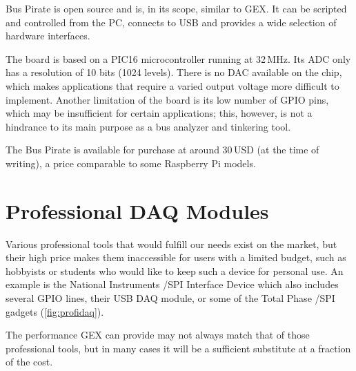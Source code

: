 Bus Pirate is open source and is, in its scope, similar to GEX. It can be scripted and controlled from the PC, connects to USB and provides a wide selection of hardware interfaces.

The board is based on a PIC16 microcontroller running at 32\,MHz. Its \gls{ADC} only has a resolution of 10 bits (1024 levels). There is no \gls{DAC} available on the chip, which makes applications that require a varied output voltage more difficult to implement. Another limitation of the board is its low number of \gls{GPIO} pins, which may be insufficient for certain applications; this, however, is not a hindrance to its main purpose as a bus analyzer and tinkering tool. 

The Bus Pirate is available for purchase at around 30\,USD (at the time of writing), a price comparable to some Raspberry Pi models.

\section{Professional DAQ Modules}

Various professional tools that would fulfill our needs exist on the market, but their high price makes them inaccessible for users with a limited budget, such as hobbyists or students who would like to keep such a device for personal use. An example is the National Instruments \IIC/SPI Interface Device which also includes several \gls{GPIO} lines, their USB DAQ module, or some of the Total Phase \IIC/SPI gadgets (\cref{fig:profidaq}).

The performance GEX can provide may not always match that of those professional tools, but in many cases it will be a sufficient substitute at a fraction of the cost.

